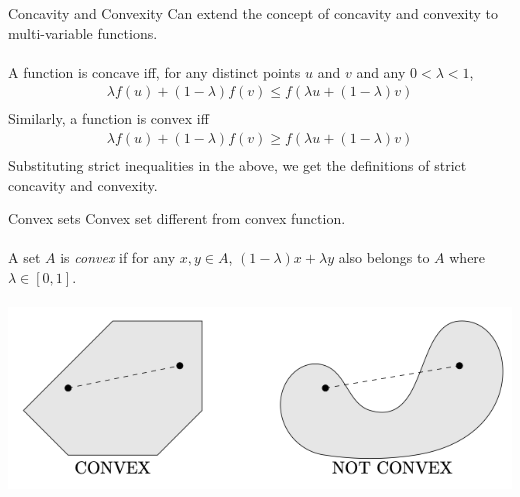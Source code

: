\documentclass{./../../Latex/teaching_slides}
\begin{document}
\begin{frame}{Concavity and Convexity}
Can extend the concept of concavity and convexity to multi-variable functions. \\~\\ 

A function is concave iff, for any distinct points $u$ and $v$ and any $0<\lambda<1$,
$$
\begin{gathered}
\lambda f(u)+(1-\lambda) f(v) \leq f(\lambda u+(1-\lambda) v) \\
\end{gathered}
$$
Similarly, a function is convex iff 
$$
\begin{gathered}
\lambda f(u)+(1-\lambda) f(v) \geq f(\lambda u+(1-\lambda) v) \\
\end{gathered}
$$
Substituting strict inequalities in the above, we get the definitions of strict concavity and convexity. 
\end{frame}


\begin{frame}{Convex sets}
Convex set different from convex function. \\~\\
A set $A$ is \textit{convex} if for any $x, y \in A$, $(1-\lambda) x + \lambda y$ also belongs to $A$ where $\lambda \in [0,1]. $ \\~\\ \centering
\includegraphics[scale=0.5]{convex_set.png}
\end{frame}

\end{document}
